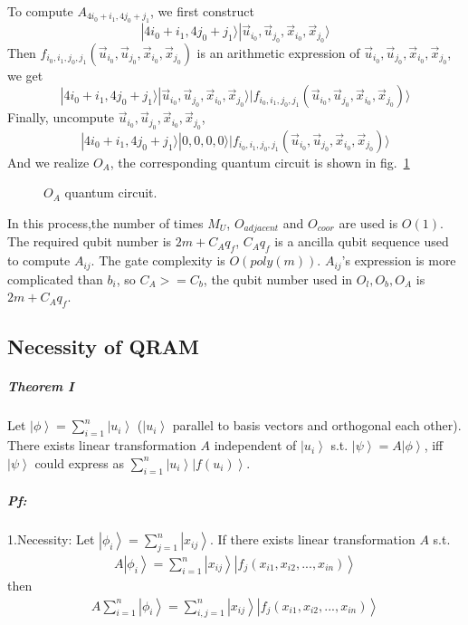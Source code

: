 \documentclass[%
 reprint,
 amsmath,amssymb,
pra,
]{revtex4-1}
\begin{document}
\begin{itemize}
To compute $A_{4i_0+i_1,4j_0+j_1}$, we first construct
$$
|4i_0+i_1,4j_0+j_1\rangle|\vec{u}_{i_0},\vec{u}_{j_0},\vec{x}_{i_0},\vec{x}_{j_0}\rangle
$$
Then $f_{i_0,i_1,j_0,j_1}(\vec{u}_{i_0},\vec{u}_{j_0},\vec{x}_{i_0},\vec{x}_{j_0})$  is an arithmetic expression of $\vec{u}_{i_0},\vec{u}_{j_0},\vec{x}_{i_0},\vec{x}_{j_0}$, we get
$$
|4i_0+i_1,4j_0+j_1\rangle|\vec{u}_{i_0},\vec{u}_{j_0},\vec{x}_{i_0},\vec{x}_{j_0}\rangle|f_{i_0,i_1,j_0,j_1}(\vec{u}_{i_0},\vec{u}_{j_0},\vec{x}_{i_0},\vec{x}_{j_0})\rangle
$$
Finally, uncompute $\vec{u}_{i_0},\vec{u}_{j_0},\vec{x}_{i_0},\vec{x}_{j_0}$,
$$
|4i_0+i_1,4j_0+j_1\rangle|0,0,0,0\rangle|f_{i_0,i_1,j_0,j_1}(\vec{u}_{i_0},\vec{u}_{j_0},\vec{x}_{i_0},\vec{x}_{j_0})\rangle
$$
And we realize $O_A$, the corresponding quantum circuit is shown in fig.~\ref{OA} 
\begin{figure}[htbp]
    \caption{$O_A$ quantum circuit. }
    \label{OA}
\end{figure}
In this process,the number of times $M_U$, $O_{adjacent}$ and $O_{coor}$ are used is $O(1)$. The required qubit number is $2m+C_Aq_f$, $C_Aq_f$ is a ancilla qubit sequence used to compute $A_{ij}$. The gate complexity is $O(poly(m))$. $A_{ij}$'s expression is more complicated than $b_i$, so $C_A>=C_b$, the qubit number used in $O_l,O_b,O_A$ is $2m+C_Aq_f$.

\subsection{Necessity of QRAM}
\subparagraph{Theorem I} Let $\left|\phi\right\rangle = \sum_{i=1}^n \left|u_i\right\rangle$ ($\left|u_i\right\rangle$ parallel to basis vectors and orthogonal each other). There exists 
linear transformation $A$ independent of $\left|u_{i}\right\rangle$ s.t. $\left|\psi\right\rangle = A\left|\phi\right\rangle$, iff $\left|\psi\right\rangle$ could express as $\sum_{i=1}^{n}\left|u_i\right\rangle\left|f\left(u_i\right)\right\rangle$.

\subparagraph{Pf:} 1.Necessity: Let $\left|\phi_i\right\rangle = \sum_{j=1}^n \left|x_{ij}\right\rangle$. If there exists linear transformation $A$ s.t.
\begin{align*}
A\left|\phi_i\right\rangle = \sum_{i=1}^n\left|x_{ij}\right\rangle\left|f_{j}\left(x_{i1}, x_{i2}, ..., x_{in}\right)\right\rangle
\end{align*}
then
\begin{align*}
A\sum_{i=1}^{n}\left|\phi_i\right\rangle = \sum_{i, j=1}^n\left|x_{ij}\right\rangle\left|f_{j}\left(x_{i1}, x_{i2}, ..., x_{in}\right)\right\rangle
\end{align*}


\end{itemize}
\end{document}
